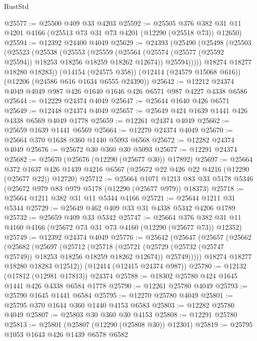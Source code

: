 \begin{lexlean}{RustStd}
\begin{coremodule}
@25577 := @25500 @409 @33 @4203
@25592 := @25505
    @376
    @382
    @31
    @11
    @4201
    @4166
    (@25513 @73 @31 @73 @4201 (@12290 (@25518 @73)) @12650)
@25594 := @12392 @24400 @4049
@25629 := @24393
    (@25490
      (@25498
        (@25503
          (@25523
            (@25538
              (@25553
                (@25559
                  (@25564 (@25574 (@25577 (@25592 @25594)) @18253 @18256 @18259 @18262 @12674))
                  @25594)))))
        @18274
        @18277
        @18280
        @18283))
    (@14154 (@24575 @358))
    (@12414 (@24579 @15068 @616))
    (@12206 (@24586 @616 @1634 @6555 @24390))
@25642 := @12212 @24374 @4049 @4049 @987 @426 @1640 @1646 @426 @6571 @987 @4227 @4338 @6586
@25644 := @12229 @24374 @4049
@25647 := @25644 @1640 @426 @6571
@25649 := @12448 @24374 @4049
@25657 := @25649 @424 @1639 @1441 @426 @4338 @6569 @4049 @1778
@25659 := @12261 @24374 @4049
@25662 := @25659 @1639 @1441 @6569
@25664 := @12270 @24374 @4049
@25670 := @25664 @370 @1638 @360 @1440 @5093 @6568
@25672 := @12282 @24374 @4049
@25676 := @25672 @30 @360 @30 @5093
@25677 := @12291 @24374
@25682 := @25670 (@25676 (@12290 (@25677 @30)) @17892)
@25697 := @25664
    @372
    @1637
    @426
    @1439
    @4216
    @6567
    (@25672 @22 @426 @22 @4216 (@12290 (@25677 @22)) @12720)
@25712 := @25664
    @1071
    @1213
    @83
    @33
    @5178
    @5346
    (@25672 @979 @83 @979 @5178 (@12290 (@25677 @979)) @18373)
@25718 := @25664 @1211 @382 @31 @11 @5344 @4166
@25721 := @25644 @1211 @31 @5344
@25729 := @25649 @462 @409 @33 @31 @4338 @5342 @4206 @1789
@25732 := @25659 @409 @33 @5342
@25747 := @25664
    @376
    @382
    @31
    @11
    @4160
    @4166
    (@25672 @73 @31 @73 @4160 (@12290 (@25677 @73)) @12352)
@25749 := @12392 @24374 @4049
@25776 := @25642
    (@25647
      (@25657
        (@25662
          (@25682
            (@25697
              (@25712
                (@25718
                  (@25721 (@25729 (@25732 (@25747 @25749)) @18253 @18256 @18259 @18262 @12674))
                  @25749)))))
        @18274
        @18277
        @18280
        @18283
        @12512))
    (@12414 (@12415 @24374 @987))
@25780 := @12132 (@17812 (@12981 @17813)) @24374
@25788 := @18302 @25780 @424 @1645 @1441 @426 @4338 @6584 @1778
@25790 := @12261 @25780 @4049
@25793 := @25790 @1645 @1441 @6584
@25795 := @12270 @25780 @4049
@25801 := @25795 @370 @1644 @360 @1440 @4153 @6583
@25803 := @12282 @25780 @4049
@25807 := @25803 @30 @360 @30 @4153
@25808 := @12291 @25780
@25813 := @25801 (@25807 (@12290 (@25808 @30)) @12301)
@25819 := @25795 @1053 @1643 @426 @1439 @6578 @6582

\end{coremodule}
\end{lexlean}
